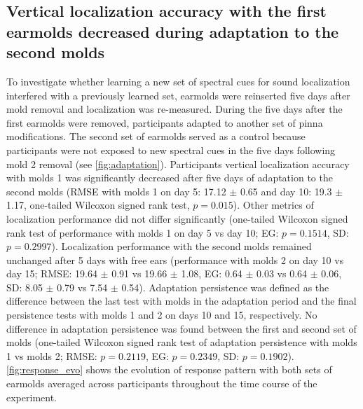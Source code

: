 \subsection{Vertical localization accuracy with the first earmolds decreased during adaptation to the second molds}

To investigate whether learning a new set of spectral cues for sound localization interfered with a previously learned set, earmolds were reinserted five days after mold removal and localization was re-measured. During the five days after the first earmolds were removed, participants adapted to another set of pinna modifications. The second set of earmolds served as a control because participants were not exposed to new spectral cues in the five days following mold 2 removal (see \cref{fig:adaptation}). Participants vertical localization accuracy with molds 1 was significantly decreased after five days of adaptation to the second molds (RMSE with molds 1 on day 5: 17.12 $\pm$ 0.65 and day 10: 19.3 $\pm$ 1.17, one-tailed Wilcoxon signed rank test, $p = 0.015$). Other metrics of localization performance did not differ significantly (one-tailed Wilcoxon signed rank test of performance with molds 1 on day 5 vs day 10; EG: $p = 0.1514$, SD: $p = 0.2997$). Localization performance with the second molds remained unchanged after 5 days with free ears (performance with molds 2 on day 10 vs day 15; RMSE: 19.64 $\pm$ 0.91 vs 19.66 $\pm$ 1.08, EG:  0.64 $\pm$ 0.03 vs 0.64 $\pm$ 0.06, SD:  8.05 $\pm$ 0.79 vs 7.54 $\pm$ 0.54). Adaptation persistence was defined as the difference between the last test with molds in the adaptation period and the final persistence tests with molds 1 and 2 on days 10 and 15, respectively. No difference in adaptation persistence was found between the first and second set of molds (one-tailed Wilcoxon signed rank test of adaptation persistence with molds 1 vs molds 2; RMSE: $p = 0.2119$, EG: $p = 0.2349$, SD: $p = 0.1902$). \cref{fig:response_evo} shows the evolution of response pattern with both sets of earmolds averaged across participants throughout the time course of the experiment.

